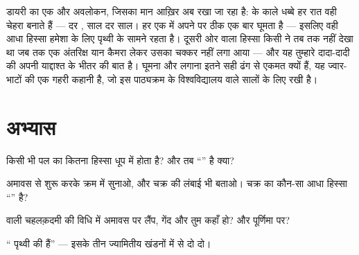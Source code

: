 \begin{remark}[वह चेहरा जो कभी नहीं मुड़ता]\label{rem:g7:moon-phases:sameface}
डायरी का एक और अवलोकन, जिसका मान आख़िर अब रखा जा रहा है:  के
काले धब्बे हर रात वही चेहरा बनाते हैं ---  दर , साल दर साल।
 हर एक  में अपने  पर ठीक एक बार घूमता है --- इसलिए
वही आधा हिस्सा हमेशा के लिए पृथ्वी के सामने रहता है। दूसरी ओर वाला
हिस्सा किसी ने तब तक नहीं देखा था जब तक एक अंतरिक्ष यान कैमरा लेकर उसका
चक्कर नहीं लगा आया --- और यह तुम्हारे दादा-दादी की अपनी याद्दाश्त के
भीतर की बात है। घूमना और  लगाना इतने सही ढंग से एकमत क्यों हैं,
यह ज्वार-भाटों की एक गहरी कहानी है, जो इस पाठ्यक्रम के विश्वविद्यालय
वाले सालों के लिए रखी है।
\end{remark}

\section{अभ्यास}

\begin{exercise}[$\star$]\label{exo:g7:moon-phases:1}
किसी भी पल  का कितना हिस्सा धूप में होता है? और तब ``'' है
क्या?
\end{exercise}

\begin{exercise}[$\star$]\label{exo:g7:moon-phases:2}
अमावस से शुरू करके  क्रम में सुनाओ, और चक्र की लंबाई भी बताओ।
चक्र का कौन-सा आधा हिस्सा ``'' है?
\end{exercise}

\begin{exercise}[$\star$]\label{exo:g7:moon-phases:3}
 वाली चहलक़दमी की विधि में अमावस पर लैंप, गेंद और तुम कहाँ हो?
और पूर्णिमा पर?
\end{exercise}

\begin{exercise}[$\star$]\label{exo:g7:moon-phases:4}
`` पृथ्वी की  हैं'' --- इसके तीन ज्यामितीय खंडनों में से दो
दो।
\end{exercise}

